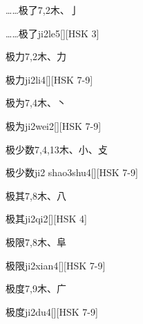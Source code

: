 \begin{Entry}{……极了}{7,2}{⽊、⼅}
  \begin{Phonetics}{……极了}{ji2le5}[][HSK 3]
  \end{Phonetics}
\end{Entry}

\begin{Entry}{极力}{7,2}{⽊、⼒}
  \begin{Phonetics}{极力}{ji2li4}[][HSK 7-9]
  \end{Phonetics}
\end{Entry}

\begin{Entry}{极为}{7,4}{⽊、⼂}
  \begin{Phonetics}{极为}{ji2wei2}[][HSK 7-9]
  \end{Phonetics}
\end{Entry}

\begin{Entry}{极少数}{7,4,13}{⽊、⼩、⽁}
  \begin{Phonetics}{极少数}{ji2 shao3shu4}[][HSK 7-9]
  \end{Phonetics}
\end{Entry}

\begin{Entry}{极其}{7,8}{⽊、⼋}
  \begin{Phonetics}{极其}{ji2qi2}[][HSK 4]
  \end{Phonetics}
\end{Entry}

\begin{Entry}{极限}{7,8}{⽊、⾩}
  \begin{Phonetics}{极限}{ji2xian4}[][HSK 7-9]
  \end{Phonetics}
\end{Entry}

\begin{Entry}{极度}{7,9}{⽊、⼴}
  \begin{Phonetics}{极度}{ji2du4}[][HSK 7-9]
  \end{Phonetics}
\end{Entry}

